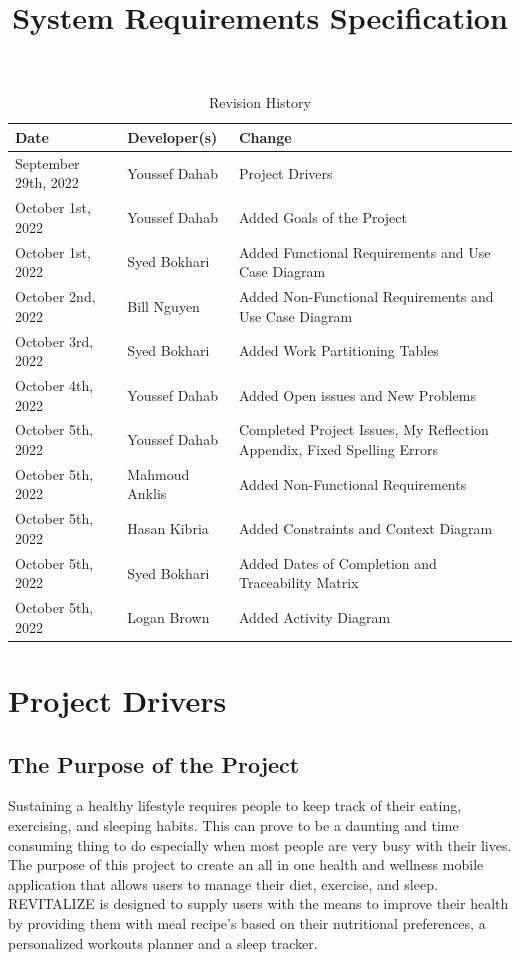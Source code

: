 \documentclass[12pt,letterpaper]{article}
\title{System Requirements Specification\\\progname}
\author{\authname}
\date{}
\begin{document}
\maketitle

\begin{table}[hp]
	\caption{Revision History} \label{TblRevisionHistory}
	\begin{tabularx}{\textwidth}{llX}
		\toprule
		\textbf{Date} & \textbf{Developer(s)} & \textbf{Change}\\
		\midrule
		September 29th, 2022 & Youssef Dahab & Project Drivers \\
		October 1st, 2022 & Youssef Dahab & Added Goals of the Project \\
		October 1st, 2022 & Syed Bokhari & Added Functional Requirements and Use Case Diagram \\
		October 2nd, 2022 & Bill Nguyen & Added Non-Functional Requirements and Use Case Diagram \\
		October 3rd, 2022 & Syed Bokhari & Added Work Partitioning Tables \\
		October 4th, 2022 & Youssef Dahab & Added Open issues and New Problems \\
		October 5th, 2022 & Youssef Dahab & Completed Project Issues, My Reflection Appendix, Fixed Spelling Errors\\
		October 5th, 2022 & Mahmoud Anklis & Added Non-Functional Requirements\\
		October 5th, 2022 & Hasan Kibria & Added Constraints and Context Diagram \\
		October 5th, 2022 & Syed Bokhari & Added Dates of Completion and Traceability Matrix \\
		October 5th, 2022 & Logan Brown & Added Activity Diagram\\
		\bottomrule
	\end{tabularx}
\end{table}

\newpage
\tableofcontents
\newpage

\section{Project Drivers}

\subsection{The Purpose of the Project}
Sustaining a healthy lifestyle requires people to keep track of their eating, exercising, and sleeping habits. This can prove to be a daunting and time consuming thing to do especially when most people are very busy with their lives. The purpose of this project to create an all in one health and wellness mobile application that allows users to manage their diet, exercise, and sleep. REVITALIZE is designed to supply users with the means to improve their health by providing them with meal recipe's based on their nutritional preferences, a personalized workouts planner and a sleep tracker. 
\end{document}
